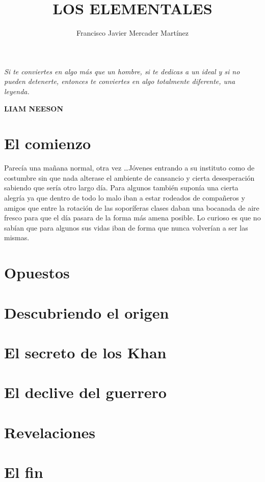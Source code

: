 \documentclass[12pt, letterpaper]{book}
\title{\textbf{LOS ELEMENTALES}}
\date{}
\author{Francisco Javier Mercader Martínez}
\begin{document}
\maketitle
\tableofcontents
\newpage
\emph{Si te conviertes en algo más que un hombre, si te dedicas a un ideal y si no pueden detenerte, entonces te conviertes en algo totalmente diferente, una leyenda.} 

\textbf{LIAM NEESON}
\chapter{El comienzo}
Parecía una mañana normal, otra vez \dots Jóvenes entrando a su instituto como de costumbre sin que nada alterase el ambiente de cansancio y cierta desesperación sabiendo que sería otro largo día. Para algunos también suponía una cierta alegría ya que dentro de todo lo malo iban a estar rodeados de compañeros y amigos que entre la rotación de las soporíferas clases daban una bocanada de aire fresco para que el día pasara de la forma más amena posible. Lo curioso es que no sabían que para algunos sus vidas iban de forma que nunca volverían a ser las mismas.


\chapter{Opuestos}
\chapter{Descubriendo el origen}
\chapter{El secreto de los Khan}
\chapter{El declive del guerrero}
\chapter{Revelaciones}
\chapter{El fin}
\end{document}
